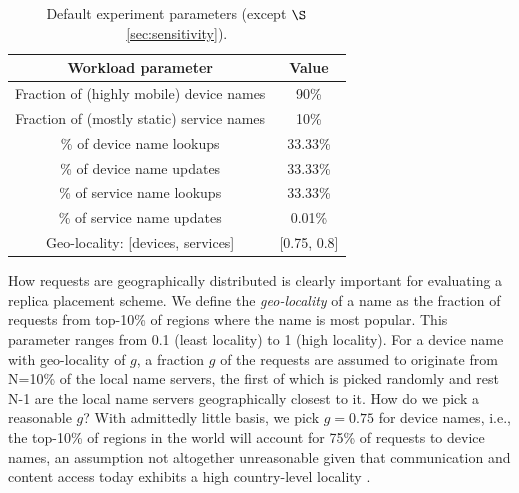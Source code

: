 \begin{table}[t]
\centering
\small{
\begin{tabular}{c|c}
{\bf Workload parameter} & {\bf Value} \\ \hline
Fraction of (highly mobile) device names & 90\%  \\ \hline
Fraction of (mostly static) service names & 10\%   \\ \hline
\% of device name lookups   & 33.33\%  \\ \hline
\% of device name updates  & 33.33\% \\ \hline
\% of service name lookups   & 33.33\%  \\ \hline
\% of service name updates  & 0.01\% \\ \hline
Geo-locality: [devices, services] & [0.75, 0.8]  \\ \hline
\end{tabular}
}
\caption{Default experiment parameters (except $\S$\ref{sec:sensitivity}).}
\vspace{-0.15in}
\label{tab:setup}
\end{table}


How requests are geographically distributed is clearly important for evaluating a replica placement scheme.  We define the {\em geo-locality} of a name as the fraction of requests from top-10\% of regions where the name is most popular. This parameter ranges from 0.1 (least locality) to 1 (high locality). For a device name with  geo-locality of $g$,  a fraction $g$ of the requests are assumed to originate from N=10\% of the local name servers, the first of which is picked randomly and rest N-1 are the local name servers geographically closest to it. How do we pick a reasonable $g$? With admittedly little basis, we pick $g=0.75$ for device names, i.e., the top-10\% of regions in the world will account for 75\% of requests to device names, an assumption not altogether unreasonable given that communication and content access today exhibits a high country-level locality \cite{twitter-www, locality-conext}.



